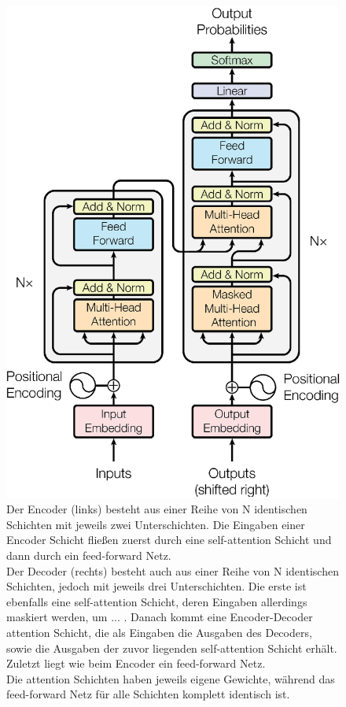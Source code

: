 \documentclass[conference]{IEEEtran}
\begin{document}
\begin{figure}[htbp]
\centerline{\includegraphics{img/figure1.png}}
\caption{Der Encoder (links) besteht aus einer Reihe von N identischen Schichten mit jeweils zwei Unterschichten. Die Eingaben einer Encoder Schicht fließen zuerst durch eine self-attention Schicht und dann durch ein feed-forward Netz. \\
Der Decoder (rechts) besteht auch aus einer Reihe von N identischen Schichten, jedoch mit jeweils drei Unterschichten. Die erste ist ebenfalls eine self-attention Schicht, deren Eingaben allerdings maskiert werden, um ... . Danach kommt eine Encoder-Decoder attention Schicht, die als Eingaben die Ausgaben des Decoders, sowie die Ausgaben der zuvor liegenden self-attention Schicht erhält. Zuletzt liegt wie beim Encoder ein feed-forward Netz. \\
Die attention Schichten haben jeweils eigene Gewichte, während das feed-forward Netz für alle Schichten komplett identisch ist. \cite{attention_is_all_you_need}}
\label{fig:1}
\end{figure}
\end{document}

